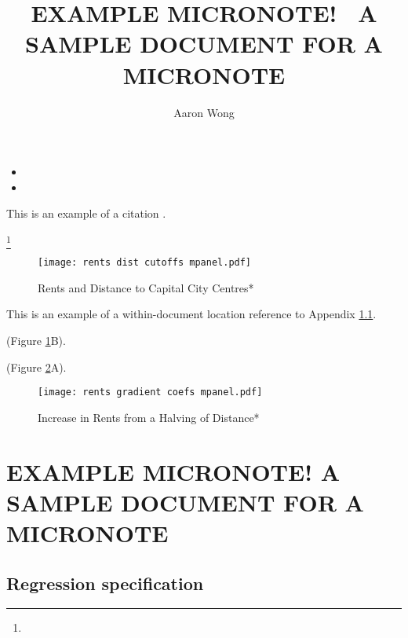 \documentclass[10pt,openany,leqno]{e61note}
\begin{document}
\baselineskip=14pt
\emergencystretch=5pt
\sloppy

\title{EXAMPLE MICRONOTE! ~\newline A SAMPLE DOCUMENT FOR A MICRONOTE}
\author{Aaron Wong}

\maketitle

\begin{Boxx}
\lipsum[][1-2]
\begin{itemize}[noitemsep]
    \item \lipsum[2][1]
    \item \lipsum[3][1]
\end{itemize}
\end{Boxx}

\lipsum[1] This is an example of a citation \parencite{Fitzgerald20,Ziffer20}.

\lipsum[2]\footnote{\lipsum[3]}

\begin{figure}[h]
\caption{Rents and Distance to Capital City Centres*}
\label{fig:bins}
\texttt{[image: rents dist cutoffs mpanel.pdf]}\centering
\end{figure}

\lipsum[4] This is an example of a within-document location reference to Appendix \ref{app:regs}. 

\lipsum[][1-3] (Figure \ref{fig:bins}B).

\lipsum[][1] (Figure \ref{fig:dist_coefs}A). \lipsum[][2]

\begin{figure}[h]
\caption{Increase in Rents from a Halving of Distance*}
\label{fig:dist_coefs}
\texttt{[image: rents gradient coefs mpanel.pdf]}\centering
\end{figure}

\lipsum[6-8]

\printbibliography[heading=subbibliography, title={References}]

\appendix

\chapter{EXAMPLE MICRONOTE! A SAMPLE DOCUMENT FOR A MICRONOTE}

\section{Regression specification}\label{app:regs}
\end{document}
